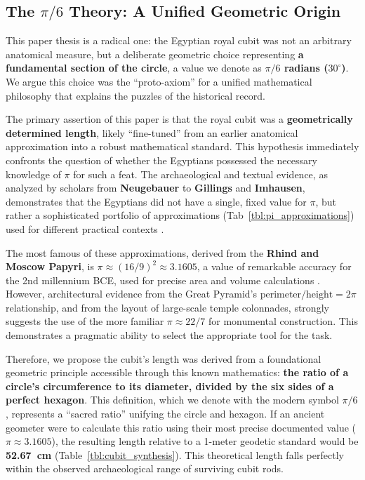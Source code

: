 \documentclass[11pt]{article}
\begin{document}
\subsection{The \texorpdfstring{$\pi/6$}{pi/6} Theory: A Unified Geometric Origin}

This paper thesis is a radical one: the Egyptian royal cubit was not an arbitrary anatomical measure, but a deliberate geometric choice representing \textbf{a fundamental section of the circle}, a value we denote as \textbf{$\pi/6$ radians ($30^\circ$)}. We argue this choice was the ``proto-axiom'' for a unified mathematical philosophy that explains the puzzles of the historical record.

The primary assertion of this paper is that the royal cubit was a \textbf{geometrically determined length}, likely ``fine-tuned'' from an earlier anatomical approximation into a robust mathematical standard. This hypothesis immediately confronts the question of whether the Egyptians possessed the necessary knowledge of $\pi$ for such a feat. The archaeological and textual evidence, as analyzed by scholars from \textbf{Neugebauer} to \textbf{Gillings} and \textbf{Imhausen}, demonstrates that the Egyptians did not have a single, fixed value for $\pi$, but rather a sophisticated portfolio of approximations (Tab~\ref{tbl:pi_approximations}) used for different practical contexts \cite{gillings1982mathematics, imhausen2016mathematics}.

The most famous of these approximations, derived from the \textbf{Rhind and Moscow Papyri}, is $\pi \approx (16/9)^2 \approx 3.1605$, a value of remarkable accuracy for the 2nd millennium BCE, used for precise area and volume calculations \cite{clagett1999ancient}. However, architectural evidence from the Great Pyramid's $\text{perimeter}/\text{height} = 2\pi$ relationship, and from the layout of large-scale temple colonnades, strongly suggests the use of the more familiar $\pi \approx 22/7$ for monumental construction. This demonstrates a pragmatic ability to select the appropriate tool for the task.

Therefore, we propose the cubit's length was derived from a foundational geometric principle accessible through this known mathematics: \textbf{the ratio of a circle's circumference to its diameter, divided by the six sides of a perfect hexagon}. This definition, which we denote with the modern symbol $\pi/6$, represents a ``sacred ratio'' unifying the circle and hexagon. If an ancient geometer were to calculate this ratio using their most precise documented value ($\pi \approx 3.1605$), the resulting length relative to a 1-meter geodetic standard would be \textbf{\SI{52.67}{\centi\meter}} (Table~\ref{tbl:cubit_synthesis}). This theoretical length falls perfectly within the observed archaeological range of surviving cubit rods. 
\end{document}
